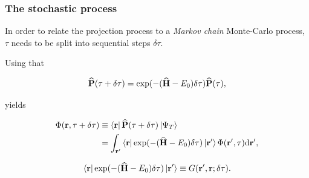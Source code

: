 \begin{frame}
 \frametitle{The stochastic process}
 In order to relate the projection process to a \textit{Markov chain} Monte-Carlo process, $\tau$ needs to be split into sequential steps $\delta\tau$. 
 \shift
 
Using that 
 

\begin{equation*}
 {\bf\widehat{P}}(\tau + \delta\tau) = \exp(-({\bf\widehat{H}} - E_0)\delta\tau){\bf\widehat{P}}(\tau),
\end{equation*}

yields 


\begin{align*}
\Phi(\mathbf{r}, \tau + \delta\tau) &\equiv \left< \mathbf{r} \right|{\bf\widehat{P}}(\tau + \delta\tau)\left| \Psi_T \right> \\
   &= \int_\mathbf{r'}\left< \mathbf{r} \right|\exp(-({\bf\widehat{H}} - E_0)\delta\tau)\left| \mathbf{r'} \right>\Phi(\mathbf{r'}, \tau)\mathrm{d}\mathbf{r'},
\end{align*}

\pause

\begin{equation*} 
\left< \mathbf{r} \right|\exp(-({\bf\widehat{H}} - E_0)\delta\tau)\left| \mathbf{r'} \right> \equiv G(\mathbf{r'}, \mathbf{r}; \delta\tau).
\end{equation*}


 
 
 
\end{frame}





